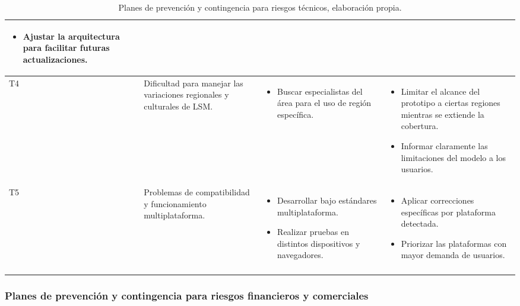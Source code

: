 \begin{longtable}{|>{\centering\arraybackslash}p{0.8cm}|>{\raggedright\arraybackslash}p{3.5cm}|>{\raggedright\arraybackslash}p{5.1cm}|>{\raggedright\arraybackslash}p{5.1cm}|}
\begin{itemize}
		\item Ajustar la arquitectura para facilitar futuras actualizaciones.
	\end{itemize} \\
	\hline
	T4 & Dificultad para manejar las variaciones regionales y culturales de LSM. &
	\begin{itemize}
		\item Buscar especialistas del área para el uso de región específica.
	\end{itemize} &
	\begin{itemize}
		\item Limitar el alcance del prototipo a ciertas regiones mientras se extiende la cobertura.
		\item Informar claramente las limitaciones del modelo a los usuarios.
	\end{itemize} \\
	\hline
	T5 & Problemas de compatibilidad y funcionamiento multiplataforma. &
	\begin{itemize}
		\item Desarrollar bajo estándares multiplataforma.
		\item Realizar pruebas en distintos dispositivos y navegadores.
	\end{itemize} &
	\begin{itemize}
		\item Aplicar correcciones específicas por plataforma detectada.
		\item Priorizar las plataformas con mayor demanda de usuarios.
	\end{itemize} \\
	\hline
	\caption[Planes de prevención y contingencia para riesgos técnicos]{Planes de prevención y contingencia para riesgos técnicos, elaboración propia.} \label{tab:riesgos_tecnicos}\\
\end{longtable}


\newpage

\subsubsection{Planes de prevención y contingencia para riesgos financieros y comerciales}

\setlength{\tabcolsep}{4pt}
\renewcommand{\arraystretch}{1.2}

